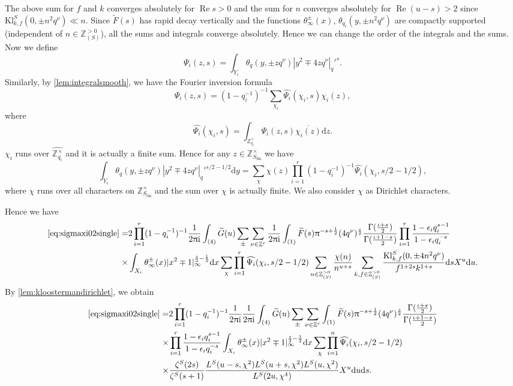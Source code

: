 \documentclass[10pt,oneside,reqno]{amsart}
\makeatletter
\newcommand\rmd{\mathrm{d}}
\newcommand\rmi{\mathrm{i}}
\newcommand\ZZ{\mathbb{Z}}
\newcommand\dpii{2\uppi\rmi}
\renewcommand\Re{\mathop{\mathrm{Re}}}
\newcommand\fin{\mathrm{fin}}
\newcommand\Kl{\mathrm{Kl}}
\theoremstyle{THEOREM}
\theoremstyle{DEFINITION}
\theoremstyle{EXERCISE}
\numberwithin{equation}{section}
\renewenvironment{proof}[1][\proofname]{\par
  \vspace{-6pt}
  \pushQED{\qed}
  \normalfont \topsep6\p@\@plus6\p@\relax
  \trivlist
  \item[\hskip\labelsep\rmfamily\bfseries
    #1\@addpunct{:}]\ignorespaces
}{
  \popQED\endtrivlist\@endpefalse
  \vspace{-6pt}
}
\makeatother
\begin{document}
\begin{proof}
The above sum for $f$ and $k$ converges absolutely for $\Re s>0$ and the sum for $n$ converges absolutely for $\Re (u-s)>2$ since $\Kl_{k,f}^S(0,\pm n^2q^\nu)\ll n$. Since $\widetilde{F}(s)$ has rapid decay vertically and the functions $\theta_\infty^\pm(x)$, $\theta_{q_i}(y,\pm n^2q^\nu)$ are compactly supported (independent of $n\in \ZZ_{(S)}^{>0}$), all the sums and integrals converge absolutely.
Hence we can change the order of the integrals and the sums. Now we define
\[
\Psi_i(z,s)=\int_{Y_\epsilon}\theta_{q}(y,\pm zq^\nu)|y^2\mp 4zq^\nu|_q'^{s}.
\]
Similarly, by \autoref{lem:integralsmooth}, we have the Fourier inversion formula
\[
\Psi_i(z,s)=(1-q_i^{-1})^{-1}\sum_{\chi_i}\widehat{\Psi_i}(\chi_i,s)\chi_i(z),
\] 
where 
\[
\widehat{\Psi_i}(\chi_i,s)=\int_{\ZZ_{q_i}^\times}\Psi_i(z,s)\overline{\chi_i(z)}\rmd z.
\]
$\chi_i$ runs over $\widehat{\ZZ_{q_i}^\times}$ and it is actually a finite sum. Hence for any $z\in \ZZ_{S_\fin}^\times$ we have
\[
\int_{Y_\epsilon}\theta_{q}(y,\pm zq^\nu)|y^2\mp 4zq^\nu|_q'^{s/2-1/2}\rmd y=\sum_{\chi}\chi(z)\prod_{i=1}^{r}(1-q_i^{-1})^{-1}\widehat{\Psi_i} (\chi_i,s/2-1/2),
\]
where $\chi$ runs over all characters on $\ZZ_{S_\fin}^\times$ and the sum over $\chi$ is actually finite. We also consider $\chi$ as Dirichlet characters.

Hence we have
\begin{align*}
\eqref{eq:sigmaxi02single}=&2\prod_{i=1}^{r}(1-q_i^{-1})^{-1}\frac{1}{\dpii} \int_{(4)}\widetilde{G}(u)\sum_{\pm}\sum_{\nu\in \ZZ^r}\frac{1}{\dpii}\int_{(1)}\widetilde{F}(s)\uppi^{-s+\frac12}(4q^\nu)^{\frac s2} \frac{\Gamma(\frac{\iota+s}{2})}{\Gamma(\frac{\iota+1-s}{2})}\prod_{i=1}^{r}\frac{1-\epsilon_i q_i^{s-1}}{1-\epsilon_iq_i^{-s}}\\
  \times& \int_{X_\iota}\theta_\infty^\pm(x)|x^2\mp 1|_\infty^{\frac s2-\frac12}\rmd x \sum_{\chi}\prod_{i=1}^{r}\widehat{\Psi_i}(\chi_i,s/2-1/2)\sum_{n\in \ZZ_{(S)}^{>0}}\frac{\chi(n)}{n^{u+s}}\sum_{k,f\in \ZZ_{(S)}^{>0}}\frac{\Kl_{k,f}^S(0,\pm 4n^2q^\nu)}{f^{1+2s}k^{1+s}}\rmd s X^u\rmd u.
\end{align*}
By \autoref{lem:kloostermandirichlet}, we obtain
\begin{align*}
\eqref{eq:sigmaxi02single}=&2\prod_{i=1}^{r}(1-q_i^{-1})^{-1}\frac{1}{\dpii}\frac{1}{\dpii}\int_{(4)} \widetilde{G}(u)\sum_{\pm}\sum_{\nu\in \ZZ^r}\int_{(1)}\widetilde{F}(s)\uppi^{-s+\frac12}(4q^\nu)^{\frac s2} \frac{\Gamma(\frac{\iota+s}{2})}{\Gamma(\frac{\iota+1-s}{2})}\\
  \times&\prod_{i=1}^{r}\frac{1-\epsilon_i q_i^{s-1}}{1-\epsilon_iq_i^{-s}} \int_{X_\iota}\theta_\infty^\pm(x)|x^2\mp 1|_\infty^{\frac s2-\frac12}\rmd x\sum_{\chi}\prod_{i=1}^{n}\widehat{\Psi_i}(\chi_i,s/2-1/2)\\
  \times&\frac{\zeta^S(2s)}{\zeta^S(s+1)} \frac{L^S(u-s,\chi^2)L^S(u+s,\chi^2)L^S(u,\chi^2)}{L^S(2u,\chi^4)} X^u\rmd u\rmd s.
\end{align*}


\end{proof}
\end{document}
